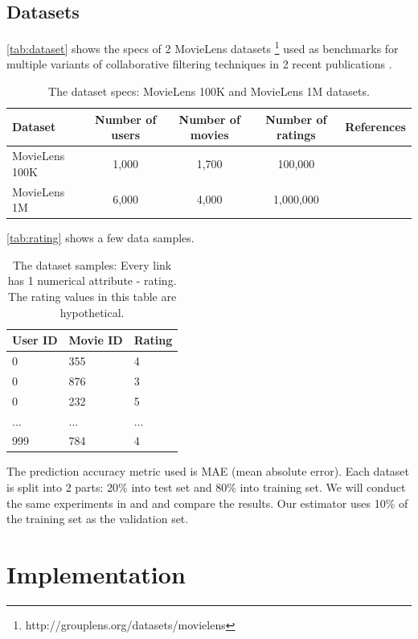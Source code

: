 \documentclass{article}
\begin{document}
\subsection{Datasets}
\autoref{tab:dataset} shows the specs of 2 MovieLens datasets 
\cite{harper2015movielens} \footnote{http://grouplens.org/datasets/movielens} 
used as benchmarks for multiple variants of collaborative filtering techniques 
in 2 recent publications \cite{hwang2016efficient} \cite{polatidis2016multi}.
\begin{table}[h]
	\centering
	\caption{The dataset specs: MovieLens 100K and MovieLens 1M datasets.}
	\begin{tabularx}{\textwidth}{ |X|c|c|c|c| }  \hline
		\textbf{Dataset} & \textbf{Number of users} & \textbf{Number of movies} 
		& \textbf{Number of ratings} & \textbf{References} \\ \hline
		MovieLens 100K & 1,000 & 1,700 & 100,000 & \cite{hwang2016efficient} \\ 
		\hline
		MovieLens 1M & 6,000 & 4,000 & 1,000,000 & \cite{polatidis2016multi} \\ 
		\hline
	\end{tabularx}
	\label{tab:dataset}
\end{table}
\autoref{tab:rating} shows a few data samples.
\begin{table}[h]
	\centering
	\caption{The dataset samples: Every link has 1 numerical attribute - 
		rating. The rating values in this table are hypothetical.}
	\begin{tabularx}{0.5\textwidth}{ |X|X|X| }  \hline
		\textbf{User ID} & \textbf{Movie ID} & \textbf{Rating} \\ \hline
		0 & 355 & 4 \\ \hline
		0 & 876 & 3 \\ \hline
		0 & 232 & 5 \\ \hline
		... & ... & ... \\ \hline
		999 & 784 & 4 \\ \hline
	\end{tabularx}
	\label{tab:rating}
\end{table}
The prediction accuracy metric used is MAE (mean absolute error).
Each dataset is split into 2 parts: 20\% into test set and 80\% 
into training set.
We will conduct the same experiments in \cite{hwang2016efficient} and  
\cite{polatidis2016multi} and compare the results.
Our estimator uses 10\% of the training set as the validation set.

\section{Implementation}
\end{document}
